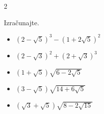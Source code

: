 \begin{multicols}{2}
        
        
            \begin{naloga}
                Izračunajte.
                \begin{itemize}
                        \item $\left(2-\sqrt{5}\right)^3-\left(1+2\sqrt{5}\right)^2$ 
                        \item $\left(2-\sqrt{3}\right)^2+\left(2+\sqrt{3}\right)^3$ 
                        \item $\left(1+\sqrt{5}\right)\sqrt{6-2\sqrt{5}}$ 
                        \item $\left(3-\sqrt{5}\right)\sqrt{14+6\sqrt{5}}$ 
                        \item $\left(\sqrt{3}+\sqrt{5}\right)\sqrt{8-2\sqrt{15}}$ 
                \end{itemize}
            \end{naloga}

            ~~~\\~\\~\\~\\~\\~\\~\\~\\~\\~\\~\\
            
        \end{multicols}









